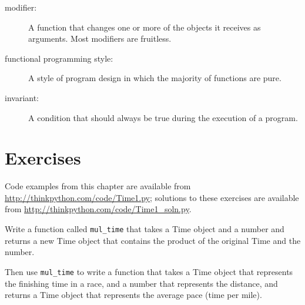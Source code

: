 \documentclass[10pt]{book}
\begin{document}
\begin{CJK}{UTF8}{gbsn}
\begin{description}
\item[modifier:] A function that changes one or more of the objects it
receives as arguments.  Most modifiers are fruitless.

\item[functional programming style:] A style of program design in which the
majority of functions are pure.

\item[invariant:] A condition that should always be true during the
execution of a program.

\end{description}


\section{Exercises}

Code examples from this chapter are available from
\url{http://thinkpython.com/code/Time1.py}; solutions to these
exercises are available from \url{http://thinkpython.com/code/Time1_soln.py}.

\begin{exercise}

Write a function called \verb"mul_time" that takes a Time object
and a number and returns a new Time object that contains
the product of the original Time and the number.

Then use \verb"mul_time" to write a function that takes a Time
object that represents the finishing time in a race, and a number
that represents the distance, and returns a Time object that represents
the average pace (time per mile).

\end{exercise}






\end{CJK}
\end{document}
